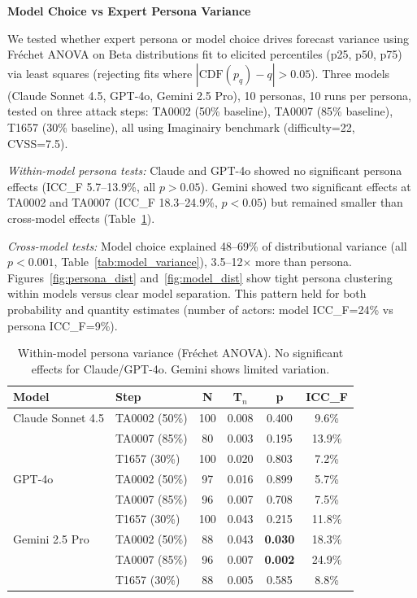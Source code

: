 
\textbf{Model Choice vs Expert Persona Variance}

We tested whether expert persona or model choice drives forecast variance using Fréchet ANOVA on Beta distributions fit to elicited percentiles (p25, p50, p75) via least squares (rejecting fits where $|\text{CDF}(p_q) - q| > 0.05$). Three models (Claude Sonnet 4.5, GPT-4o, Gemini 2.5 Pro), 10 personas, 10 runs per persona, tested on three attack steps: TA0002 (50\% baseline), TA0007 (85\% baseline), T1657 (30\% baseline), all using Imaginairy benchmark (difficulty=22, CVSS=7.5).

\textit{Within-model persona tests:} Claude and GPT-4o showed no significant persona effects (ICC\_F 5.7--13.9\%, all $p > 0.05$). Gemini showed two significant effects at TA0002 and TA0007 (ICC\_F 18.3--24.9\%, $p < 0.05$) but remained smaller than cross-model effects (Table~\ref{tab:persona_variance}).

\textit{Cross-model tests:} Model choice explained 48--69\% of distributional variance (all $p < 0.001$, Table~\ref{tab:model_variance}), 3.5--12$\times$ more than persona. Figures~\ref{fig:persona_dist} and~\ref{fig:model_dist} show tight persona clustering within models versus clear model separation. This pattern held for both probability and quantity estimates (number of actors: model ICC\_F=24\% vs persona ICC\_F=9\%).

\begin{table}[htbp]
\centering
\caption{Within-model persona variance (Fréchet ANOVA). No significant effects for Claude/GPT-4o. Gemini shows limited variation.}
\label{tab:persona_variance}
\small
\begin{tabular}{llcccc}
\toprule
\textbf{Model} & \textbf{Step} & \textbf{N} & \textbf{T$_n$} & \textbf{p} & \textbf{ICC\_F} \\
\midrule
Claude Sonnet 4.5 & TA0002 (50\%) & 100 & 0.008 & 0.400 & 9.6\% \\
 & TA0007 (85\%) & 80 & 0.003 & 0.195 & 13.9\% \\
 & T1657 (30\%) & 100 & 0.020 & 0.803 & 7.2\% \\
\midrule
GPT-4o & TA0002 (50\%) & 97 & 0.016 & 0.899 & 5.7\% \\
 & TA0007 (85\%) & 96 & 0.007 & 0.708 & 7.5\% \\
 & T1657 (30\%) & 100 & 0.043 & 0.215 & 11.8\% \\
\midrule
Gemini 2.5 Pro & TA0002 (50\%) & 88 & 0.043 & \textbf{0.030} & 18.3\% \\
 & TA0007 (85\%) & 96 & 0.007 & \textbf{0.002} & 24.9\% \\
 & T1657 (30\%) & 88 & 0.005 & 0.585 & 8.8\% \\
\bottomrule
\end{tabular}
\end{table}

